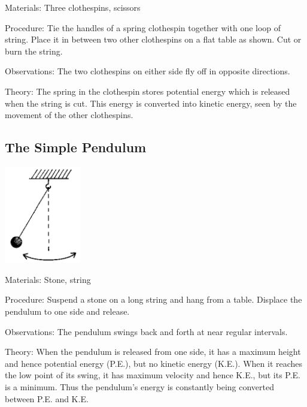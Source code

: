 \begin{multicols}{2}
\begin{description*}
\item[Materials:]{Three clothespins, scissors}
\item[Procedure:]{Tie the handles of a spring clothespin together with one loop of string. Place it in between two other clothespins on a flat table as shown. Cut or burn the string.}
\item[Observations:]{The two clothespins on either side fly off in opposite directions.}
\item[Theory:]{The spring in the clothespin stores potential energy which is released when the string is cut. This energy is converted into kinetic energy, seen by the movement of the other clothespins.}
\end{description*}

\subsection{The Simple Pendulum}

\begin{center}
\includegraphics[width=0.25\textwidth]{./img/source/pendulum.png}
\end{center}

\begin{description*}
\item[Materials:]{Stone, string}
\item[Procedure:]{Suspend a stone on a long string and hang from a table. Displace the pendulum to one side and release.}
\item[Observations:]{The pendulum swings back and forth at near regular intervals.}
\item[Theory:]{When the pendulum is released from one side, it has a maximum height and hence potential energy (P.E.), but no kinetic energy (K.E.). When it reaches the low point of its swing, it has maximum velocity and hence K.E., but its P.E. is a minimum. Thus the pendulum's energy is constantly being converted between P.E. and K.E.}
\end{description*}


\end{multicols}
